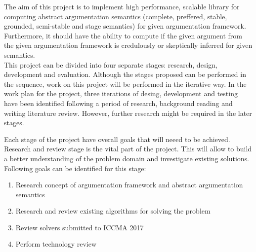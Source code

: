 The aim of this project is to implement high performance, scalable library for computing abstract argumentation semantics (complete, preffered, stable, grounded, semi-stable and stage semantics) for given argumentation framework. Furthermore, it should have the ability to compute if the given argument from the given argumentation framework is credulously or skeptically inferred for given semantics.\\
This project can be divided into four separate stages: research, design, development and evaluation. Although the stages proposed can be performed in the sequence, work on this project will be performed in the iterative way. In the work plan for the project, three iterations of desing, development and testing have been identified following a period of research, background reading and writing literature review. However, further research might be required in the later stages.

Each stage of the project have overall goals that will neeed to be achieved. Research and review stage is the vital part of the project. This will allow to build a better understanding of the problem domain and investigate existing solutions. Following goals can be identified for this stage:
\begin{enumerate}
	\item{Research concept of argumentation framework and abstract argumentation semantics}
	\item{Research and review existing algorithms for solving the problem}
	\item{Review solvers submitted to ICCMA 2017}
	\item{Perform technology review}
\end{enumerate}

